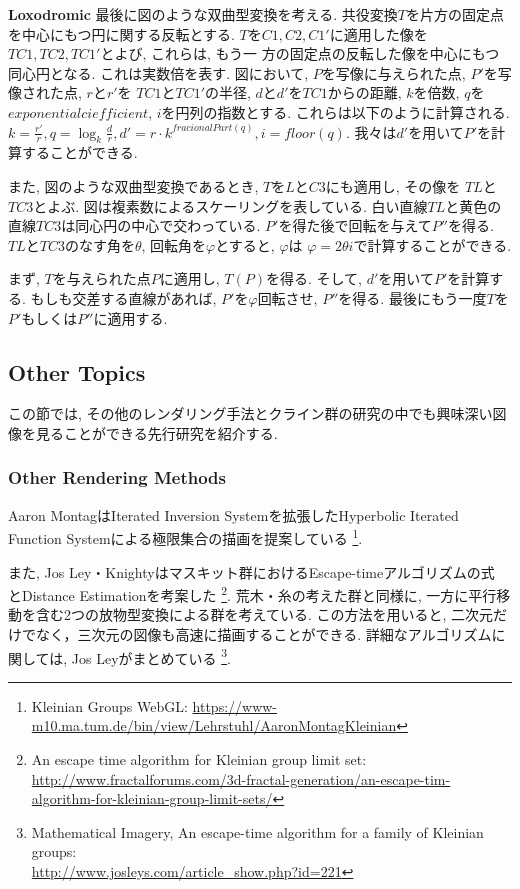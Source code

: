 \noindent\textbf{Loxodromic}
最後に図のような双曲型変換を考える.
共役変換$T$を片方の固定点を中心にもつ円に関する反転とする.
$T$を$C1, C2, C1'$に適用した像を$TC1, TC2, TC1'$とよび, これらは, もう一
方の固定点の反転した像を中心にもつ同心円となる.
これは実数倍を表す.
図において, $P$を写像に与えられた点, $P'$を写像された点, $r$と$r'$を
$TC1$と$TC1'$の半径, $d$と$d'$を$TC1$からの距離, $k$を倍数, $q$を
$exponential ciefficient$,  $i$を円列の指数とする.
これらは以下のように計算される.
 \begin{math}
  k = \frac{r'}{r},
  q = \log_{k} \frac{d}{r},
  d' = r \cdot k^{fracionalPart(q)},
  i = floor(q).
 \end{math}
我々は$d'$を用いて$P'$を計算することができる.

また, 図のような双曲型変換であるとき, $T$を$L$と$C3$にも適用し, その像を
$TL$と$TC3$とよぶ.
図は複素数によるスケーリングを表している.
白い直線$TL$と黄色の直線$TC3$は同心円の中心で交わっている.
$P'$を得た後で回転を与えて$P''$を得る.
$TL$と$TC3$のなす角を$\theta$, 回転角を$\varphi$とすると, $\varphi$は
$\varphi = 2 \theta i$で計算することができる.

まず, $T$を与えられた点$P$に適用し, $T(P)$を得る.
そして, $d'$を用いて$P'$を計算する.
もしも交差する直線があれば, $P'$を$\varphi$回転させ, $P''$を得る.
最後にもう一度$T$を$P'$もしくは$P''$に適用する.

\subsection{Other Topics}

この節では, その他のレンダリング手法とクライン群の研究の中でも興味深い図
像を見ることができる先行研究を紹介する.

\subsubsection{Other Rendering Methods}
Aaron MontagはIterated Inversion Systemを拡張したHyperbolic Iterated
Function Systemによる極限集合の描画を提案している\cite{hyperbolicIFS}
\footnote{Kleinian Groups WebGL:
 \url{https://www-m10.ma.tum.de/bin/view/Lehrstuhl/AaronMontagKleinian}}.

また, Jos Ley・Knightyはマスキット群におけるEscape-timeアルゴリズムの式
とDistance Estimationを考案した
\footnote{An escape time algorithm for Kleinian group limit set:\\ \quad
\quad \url{http://www.fractalforums.com/3d-fractal-generation/an-escape-tim-algorithm-for-kleinian-group-limit-sets/}}.
荒木・糸\cite{maskit}の考えた群と同様に, 一方に平行移動を含む2つの放物型変換による群を考えている.
この方法を用いると, 二次元だけでなく，三次元の図像も高速に描画することができる.
詳細なアルゴリズムに関しては, Jos Leyがまとめている
\footnote{Mathematical Imagery, An escape-time algorithm for a family of
Kleinian groups:\\ \quad \quad \url{http://www.josleys.com/article_show.php?id=221}}.

